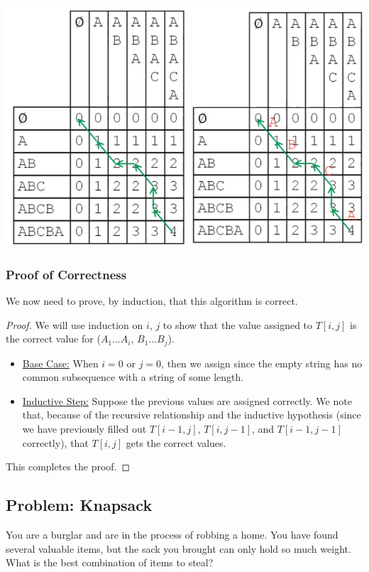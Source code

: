 \documentclass[letterpaper]{article}
\begin{document}
\begin{center}
    \includegraphics[scale=0.7]{assets/lcss_2.png}
\end{center}


\subsubsection{Proof of Correctness}
We now need to prove, by induction, that this algorithm is correct. 

\begin{mdframed}[]
    \begin{proof}
        We will use induction on $i$, $j$ to show that the value assigned to $T[i, j]$ is the correct value for ($A_1 \dots A_i$, $B_1 \dots B_j$).
        \begin{itemize}
            \item \underline{Base Case:} When $i = 0 $ or $j = 0$, then we assign  since the empty string has no common subsequence with a string of some length. 
            \item \underline{Inductive Step:} Suppose the previous values are assigned correctly. We note that, because of the recursive relationship and the inductive hypothesis (since we have previously filled out $T[i - 1, j]$, $T[i, j - 1]$, and $T[i - 1, j - 1]$ correctly), that $T[i, j]$ gets the correct values. 
        \end{itemize}
        This completes the proof. 
    \end{proof}
\end{mdframed}

\subsection{Problem: Knapsack}
You are a burglar and are in the process of robbing a home. You have found several valuable items, but the sack you brought can only hold so much weight. What is the best combination of items to steal? 
\end{document}

